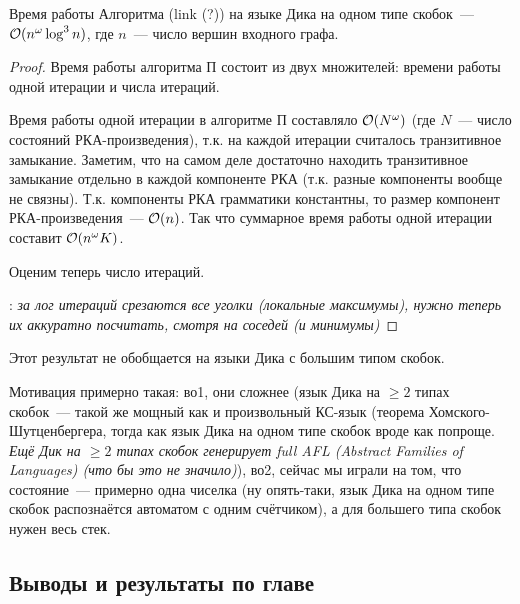 \begin{theorem}
Время работы Алгоритма (link (?)) на языке Дика на одном типе скобок~--- $\mathcal{O}(n^{\omega} \log^3 n)$, где $n$~--- число вершин входного графа.
\end{theorem}

\begin{proof}
Время работы алгоритма П состоит из двух множителей: времени работы одной итерации и числа итераций.

Время работы одной итерации в алгоритме П составляло $\mathcal{O}(N^{\omega})$ (где $N$~--- число состояний РКА-произведения), т.к. на каждой итерации считалось транзитивное замыкание. Заметим, что на самом деле достаточно находить транзитивное замыкание отдельно в каждой компоненте РКА (т.к. разные компоненты вообще не связны). Т.к. компоненты РКА грамматики константны, то размер компонент РКА-произведения~--- $\mathcal{O}(n)$. Так что суммарное время работы одной итерации составит $\mathcal{O}(n^{\omega} K)$.   

Оценим теперь число итераций. 

\TODO: \textit{за лог итераций срезаются все уголки (локальные максимумы), нужно теперь их аккуратно посчитать, смотря на соседей (и минимумы)}

\end{proof}

\begin{note}
Этот результат не обобщается на языки Дика с большим типом скобок. 

Мотивация примерно такая: во1, они сложнее (язык Дика на $\ge 2$ типах скобок~--- такой же мощный как и произвольный КС-язык (теорема Хомского-Шутценбергера, тогда как язык Дика на одном типе скобок вроде как попроще. \textit{Ещё Дик на $\ge 2$ типах скобок генерирует full AFL (Abstract Families of Languages) (что бы это не значило)}), во2, сейчас мы играли на том, что состояние~--- примерно одна чиселка (ну опять-таки, язык Дика на одном типе скобок распознаётся автоматом с одним счётчиком), а для большего типа скобок нужен весь стек.
\end{note}

\subsection{Выводы и результаты по главе}